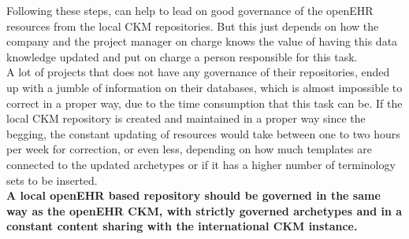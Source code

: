 \documentclass[mim_thesis.tex]{subfiles}
\begin{document}
Following these steps, can help to lead on good governance of the openEHR resources from the local CKM repositories. But this just depends on how the company and the project manager on charge knows the value of having this data knowledge updated and put on charge a person responsible for this task. \\

A lot of projects that does not have any governance of their repositories, ended up with a jumble of information on their databases, which is almost impossible to correct in a proper way, due to the time consumption that this task can be. If the local CKM repository is created and maintained in a proper way since the begging, the constant updating of resources would take between one to two hours per week for correction, or even less, depending on how much templates are connected to the updated archetypes or if it has a higher number of terminology sets to be inserted. \\

\textbf{A local openEHR based repository should be governed in the same way as the openEHR CKM, with strictly governed archetypes and in a constant content sharing with the international CKM instance.}
\end{document}
